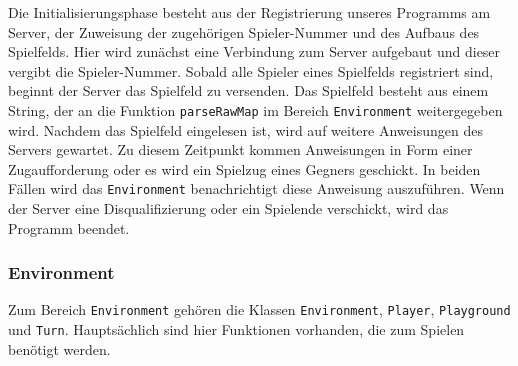 \documentclass[12pt,a4paper]{article}
\begin{document}
Die Initialisierungsphase besteht aus der Registrierung unseres Programms am Server, der Zuweisung der zugehörigen Spieler-Nummer und des Aufbaus des Spielfelds. Hier wird zunächst eine Verbindung zum Server aufgebaut und dieser vergibt die Spieler-Nummer. Sobald alle Spieler eines Spielfelds registriert sind, beginnt der Server das Spielfeld zu versenden. Das Spielfeld besteht aus einem String, der an die Funktion \texttt{parseRawMap} im Bereich \texttt{Environment} weitergegeben wird. Nachdem das Spielfeld eingelesen ist, wird auf weitere Anweisungen des Servers gewartet. Zu diesem Zeitpunkt kommen Anweisungen in Form einer Zugaufforderung oder es wird ein Spielzug eines Gegners geschickt. In beiden Fällen wird das \texttt{Environment} benachrichtigt diese Anweisung auszuführen. Wenn der Server eine Disqualifizierung oder ein Spielende verschickt, wird das Programm beendet.

\subsubsection{Environment}
Zum Bereich \texttt{Environment} gehören die Klassen \texttt{Environment}, \texttt{Player}, \texttt{Playground} und \texttt{Turn}. Hauptsächlich sind hier Funktionen vorhanden, die zum Spielen benötigt werden.
\end{document}

